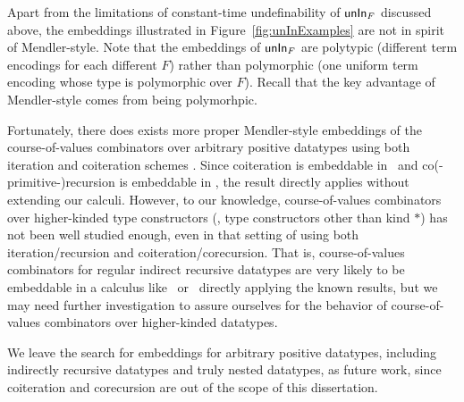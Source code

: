 Apart from the limitations of constant-time undefinability of $\mathsf{unIn}_F$
discussed above, the embeddings illustrated in Figure~\ref{fig:unInExamples}
are not in spirit of Mendler-style. Note that the embeddings of $\mathsf{unIn}_F$ are
polytypic (different term encodings for each different $F$) rather than
polymorphic (one uniform term encoding whose type is polymorphic over $F$).
Recall that the key advantage of Mendler-style comes from being polymorhpic.

Fortunately, there does exists more proper Mendler-style embeddings
of the course-of-values combinators over arbitrary positive datatypes
using both iteration and coiteration schemes \cite{TODO}. Since coiteration
is embeddable in \Fi\ and co(-primitive-)recursion is embeddable in \Fixi,
the result directly applies without extending our calculi. However,
to our knowledge, course-of-values combinators over higher-kinded
type constructors (\ie, type constructors other than kind $*$) has not been
well studied enough, even in that setting of using both iteration/recursion
and coiteration/corecursion. That is, course-of-values combinators for
regular indirect recursive datatypes are very likely to be embeddable in
a calculus like \Fi\ or \Fixi\ directly applying the known results, but
we may need further investigation to assure ourselves for the behavior of
course-of-values combinators over higher-kinded datatypes.

We leave the search for embeddings for arbitrary positive datatypes,
including indirectly recursive datatypes and truly nested datatypes,
as future work, since coiteration and corecursion are out of the scope of
this dissertation.



